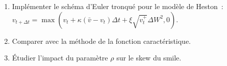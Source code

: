\begin{exercice}
\begin{enumerate}
    \item Impl\'ementer le sch\'ema d'Euler tronqu\'e pour le mod\`ele
          de Heston~: $v_{t+\Delta t} = \max(v_t + \kappa(\bar{v} - v_t)\Delta t
          + \xi\sqrt{v_t^+}\Delta W^2, 0)$.
    \item Comparer avec la m\'ethode de la fonction caract\'eristique.
    \item \'Etudier l'impact du param\`etre $\rho$ sur le skew du smile.
\end{enumerate}
\end{exercice}

